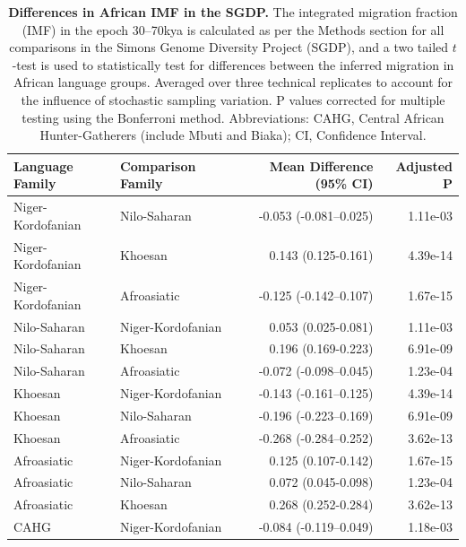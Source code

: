 \begin{table}[ht]
  \centering
  \begin{tabular}{llrr}
    \hline
  Language Family & Comparison Family & Mean Difference (95\% CI) & Adjusted P \\ 
    \hline
  Niger-Kordofanian & Nilo-Saharan & -0.053 (-0.081--0.025) & 1.11e-03 \\ 
    Niger-Kordofanian & Khoesan & 0.143 (0.125-0.161) & 4.39e-14 \\ 
    Niger-Kordofanian & Afroasiatic & -0.125 (-0.142--0.107) & 1.67e-15 \\ 
    Nilo-Saharan & Niger-Kordofanian & 0.053 (0.025-0.081) & 1.11e-03 \\ 
    Nilo-Saharan & Khoesan & 0.196 (0.169-0.223) & 6.91e-09 \\ 
    Nilo-Saharan & Afroasiatic & -0.072 (-0.098--0.045) & 1.23e-04 \\ 
    Khoesan & Niger-Kordofanian & -0.143 (-0.161--0.125) & 4.39e-14 \\ 
    Khoesan & Nilo-Saharan & -0.196 (-0.223--0.169) & 6.91e-09 \\ 
    Khoesan & Afroasiatic & -0.268 (-0.284--0.252) & 3.62e-13 \\ 
    Afroasiatic & Niger-Kordofanian & 0.125 (0.107-0.142) & 1.67e-15 \\ 
    Afroasiatic & Nilo-Saharan & 0.072 (0.045-0.098) & 1.23e-04 \\ 
    Afroasiatic & Khoesan & 0.268 (0.252-0.284) & 3.62e-13 \\ 
    CAHG & Niger-Kordofanian & -0.084 (-0.119--0.049) & 1.18e-03 \\ 
     \hline
  \end{tabular}
  \caption[Tests for significance between integrated migration fractions within African populations in the SGDP]{ {\bf Differences in African IMF in the SGDP.} The integrated migration fraction (IMF) in the epoch 30--70kya is calculated as per the Methods section for all comparisons in the Simons Genome Diversity Project (SGDP), and a two tailed $t$-test is used to statistically test for differences between the inferred migration in African language groups. Averaged over three technical replicates to account for the influence of stochastic sampling variation. P values corrected for multiple testing using the Bonferroni method. Abbreviations: CAHG, Central African Hunter-Gatherers (include Mbuti and Biaka); CI, Confidence Interval.} 
  \label{table:sgdp_pairwise}
  \end{table}


